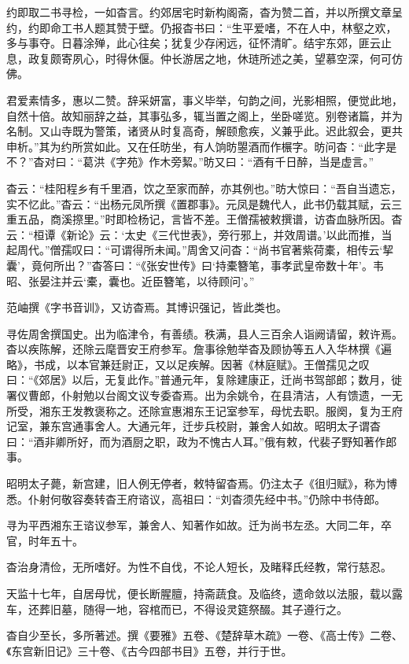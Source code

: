 \documentclass[12pt,UTF8]{ctexbook}
\begin{document}
约即取二书寻检，一如杳言。约郊居宅时新构阁斋，杳为赞二首，并以所撰文章呈约，约即命工书人题其赞于壁。仍报杳书曰：“生平爱嗜，不在人中，林壑之欢，多与事夺。日暮涂殚，此心往矣；犹复少存闲远，征怀清旷。结宇东郊，匪云止息，政复颇寄夙心，时得休偃。仲长游居之地，休琏所述之美，望慕空深，何可仿佛。

君爱素情多，惠以二赞。辞采妍富，事义毕举，句韵之间，光影相照，便觉此地，自然十倍。故知丽辞之益，其事弘多，辄当置之阁上，坐卧嗟览。别卷诸篇，并为名制。又山寺既为警策，诸贤从时复高奇，解颐愈疾，义兼乎此。迟此叙会，更共申析。”其为约所赏如此。又在任昉坐，有人饷昉曌酒而作榐字。昉问杳：“此字是不？”杳对曰：“葛洪《字苑》作木旁絜。”昉又曰：“酒有千日醉，当是虚言。”

杳云：“桂阳程乡有千里酒，饮之至家而醉，亦其例也。”昉大惊曰：“吾自当遗忘，实不忆此。”杳云：“出杨元凤所撰《置郡事》。元凤是魏代人，此书仍载其赋，云三重五品，商溪摖里。”时即检杨记，言皆不差。王僧孺被敕撰谱，访杳血脉所因。杳云：“桓谭《新论》云：‘太史《三代世表》，旁行邪上，并效周谱。’以此而推，当起周代。”僧孺叹曰：“可谓得所未闻。”周舍又问杳：“尚书官著紫荷橐，相传云‘挈囊’，竟何所出？”杳答曰：“《张安世传》曰‘持橐簪笔，事孝武皇帝数十年’。韦昭、张晏注并云‘橐，囊也。近臣簪笔，以待顾问’。”

范岫撰《字书音训》，又访杳焉。其博识强记，皆此类也。

寻佐周舍撰国史。出为临津令，有善绩。秩满，县人三百余人诣阙请留，敕许焉。杳以疾陈解，还除云麾晋安王府参军。詹事徐勉举杳及顾协等五人入华林撰《遍略》，书成，以本官兼廷尉正，又以足疾解。因著《林庭赋》。王僧孺见之叹曰：“《郊居》以后，无复此作。”普通元年，复除建康正，迁尚书驾部郎；数月，徙署仪曹郎，仆射勉以台阁文议专委杳焉。出为余姚令，在县清洁，人有馈遗，一无所受，湘东王发教褒称之。还除宣惠湘东王记室参军，母忧去职。服阕，复为王府记室，兼东宫通事舍人。大通元年，迁步兵校尉，兼舍人如故。昭明太子谓杳曰：“酒非卿所好，而为酒厨之职，政为不愧古人耳。”俄有敕，代裴子野知著作郎事。

昭明太子薨，新宫建，旧人例无停者，敕特留杳焉。仍注太子《徂归赋》，称为博悉。仆射何敬容奏转杳王府谘议，高祖曰：“刘杳须先经中书。”仍除中书侍郎。

寻为平西湘东王谘议参军，兼舍人、知著作如故。迁为尚书左丞。大同二年，卒官，时年五十。

杳治身清俭，无所嗜好。为性不自伐，不论人短长，及睹释氏经教，常行慈忍。

天监十七年，自居母忧，便长断腥膻，持斋蔬食。及临终，遗命敛以法服，载以露车，还葬旧墓，随得一地，容棺而已，不得设灵筵祭醊。其子遵行之。

杳自少至长，多所著述。撰《要雅》五卷、《楚辞草木疏》一卷、《高士传》二卷、《东宫新旧记》三十卷、《古今四部书目》五卷，并行于世。
\end{document}
